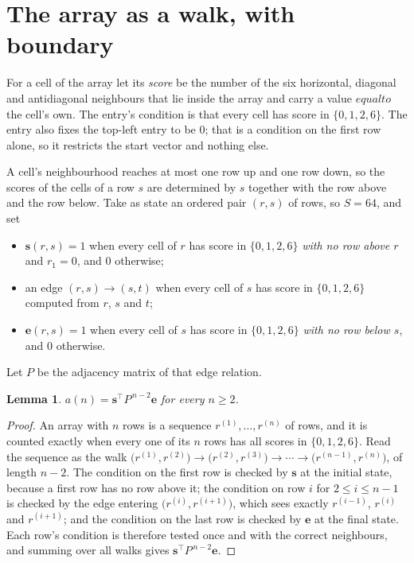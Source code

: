 \documentclass[11pt,a4paper]{article}
\theoremstyle{plain}
\newtheorem{lemma}[theorem]{Lemma}
\theoremstyle{definition}
\begin{document}
\section{The array as a walk, with boundary}

For a cell of the array let its \emph{score} be the number of the six horizontal, diagonal and antidiagonal neighbours that lie inside
the array and carry a value $equal to$ the cell's own. The entry's condition is that every cell
has score in $\{0,1,2,6\}$. The entry also fixes the top-left entry to be $0$; that is a condition on the first row alone, so it restricts the start vector and nothing else.

A cell's neighbourhood reaches at most one row up and one row down, so the scores of the
cells of a row $s$ are determined by $s$ together with the row above and the row below.
Take as state an ordered pair $(r,s)$ of rows, so $S=64$, and set
\begin{itemize}
\item $\mathbf{s}(r,s)=1$ when every cell of $r$ has score in $\{0,1,2,6\}$ \emph{with no row
above $r$} and $r_1=0$, and $0$ otherwise;
\item an edge $(r,s)\to(s,t)$ when every cell of $s$ has score in $\{0,1,2,6\}$ computed from
$r$, $s$ and $t$;
\item $\mathbf{e}(r,s)=1$ when every cell of $s$ has score in $\{0,1,2,6\}$ \emph{with no row
below $s$}, and $0$ otherwise.
\end{itemize}
Let $P$ be the adjacency matrix of that edge relation.

\begin{lemma}\label{lem:walk}
$a(n)=\mathbf{s}^{\!\top}P^{\,n-2}\mathbf{e}$ for every $n\ge2$.
\end{lemma}

\begin{proof}
An array with $n$ rows is a sequence $r^{(1)},\dots,r^{(n)}$ of rows, and it is counted
exactly when every one of its $n$ rows has all scores in $\{0,1,2,6\}$. Read the sequence as the
walk $\bigl(r^{(1)},r^{(2)}\bigr)\to\bigl(r^{(2)},r^{(3)}\bigr)\to\cdots\to
\bigl(r^{(n-1)},r^{(n)}\bigr)$, of length $n-2$. The condition on the first row is
checked by $\mathbf{s}$ at the initial state, because a first row has no row above it; the
condition on row $i$ for $2\le i\le n-1$ is checked by the edge entering
$\bigl(r^{(i)},r^{(i+1)}\bigr)$, which sees exactly $r^{(i-1)}$, $r^{(i)}$ and
$r^{(i+1)}$; and the condition on the last row is checked by $\mathbf{e}$ at the final
state. Each row's condition is therefore tested once and with the correct neighbours, and
summing over all walks gives $\mathbf{s}^{\!\top}P^{\,n-2}\mathbf{e}$.
\end{proof}
\end{document}
